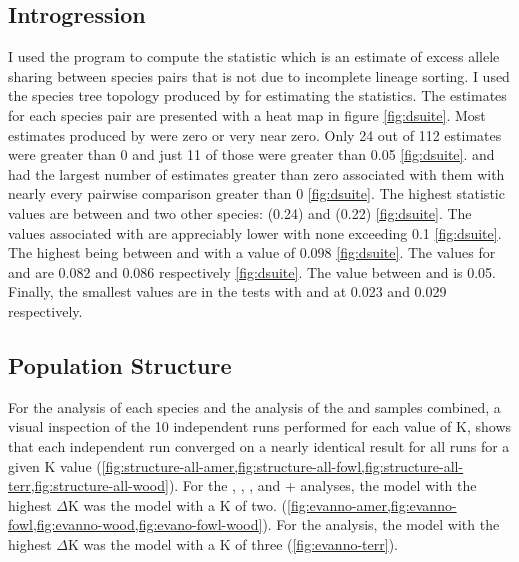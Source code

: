 \subsection{Introgression}
I used the program \dsuite to compute the \fbranch statistic which is an  
estimate of excess allele sharing between species pairs that is not due to 
incomplete lineage sorting. 
I used the species tree topology produced by \phycoeval for estimating 
the \fbranch statistics. 
The \fbranch estimates for each species pair are presented with a heat map in 
figure \cref{fig:dsuite}.
Most \fbranch estimates produced by \dsuite were zero or very near zero.
Only 24 out of 112 \fbranch estimates were greater than 0 and just 11 of those were 
greater than 0.05 \cref{fig:dsuite}.
\amer and \wood had the largest number of estimates greater than
zero associated with them with nearly every pairwise comparison greater than 0
\cref{fig:dsuite}. 
The highest \fbranch statistic values are between \amer and two other 
species: \hemiophrys (0.24) and \baxteri (0.22) \cref{fig:dsuite}.
The values associated with \wood are appreciably lower with none exceeding 
0.1 \cref{fig:dsuite}.
The highest being between \amer and \wood with a value of 0.098 \cref{fig:dsuite}.
The \wood \fbranch values for \baxteri and \hemiophrys are 0.082 and 0.086 
respectively \cref{fig:dsuite}.
The \fbranch value between \wood and \microscaphus is 0.05.
Finally, the smallest \wood \fbranch values are in the tests with \cognatus and 
\speciosus at 0.023 and 0.029 respectively.

\subsection{Population Structure}
For the \structure analysis of each species and the analysis of the \fowl and \wood
samples combined, a visual inspection of the 10 independent \structure runs 
performed for each value
of K, shows that each independent run converged on a nearly identical result 
for all runs for a given K value 
(\cref{fig:structure-all-amer,fig:structure-all-fowl,fig:structure-all-terr,fig:structure-all-wood}).
For the \amer, \fowl, \wood, and \fowl + \wood analyses, the \structure model 
with the highest $\Delta$K was the model with a K of two.   
(\cref{fig:evanno-amer,fig:evanno-fowl,fig:evanno-wood,fig:evano-fowl-wood}). 
For the \terr analysis, the \structure model with the highest $\Delta$K was 
the model with a K of three (\cref{fig:evanno-terr}).

